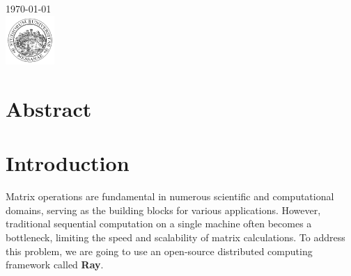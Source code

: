 \begin{titlepage}


    {\large \today}\\[2cm] %


    \includegraphics[width=70px, keepaspectratio]{unime.png}\\[1cm] %


    \vfill %

\end{titlepage}

\tableofcontents
\pagebreak

\section{Abstract}

\section{Introduction}
Matrix operations are fundamental in numerous scientific and computational domains, serving as the building blocks for various applications. However, traditional sequential computation on a single machine often becomes a bottleneck, limiting the speed and scalability of matrix calculations. To address this problem, we are going to use an open-source distributed computing framework called \textbf{Ray}.

